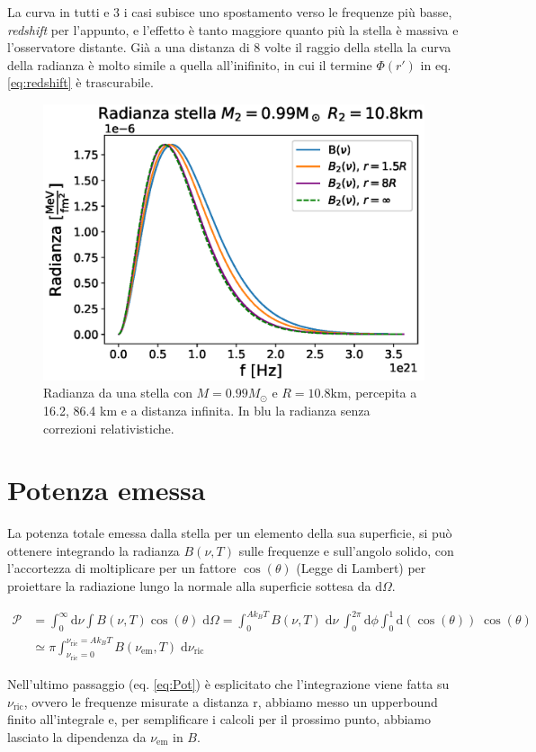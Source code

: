 \documentclass[a4paper, titlepage]{article}
\begin{document}
La curva in tutti e 3 i casi subisce uno spostamento verso le frequenze più
basse, \textit{redshift} per l'appunto, e l'effetto è tanto maggiore quanto più
la stella è massiva e l'osservatore distante. Già a una distanza di 8 volte il
raggio della stella la curva della radianza è molto simile a quella
all'inifinito, in cui il termine $\Phi (r')$ in eq. \ref{eq:redshift} è
trascurabile.
\begin{figure}[h]
    \centering
    \includegraphics[width = 0.6 \textwidth]{Figures/radianza2.eps}
    \caption{Radianza da una stella con $M = 0.99M_\odot$ e
    $R = 10.8\unit{\kilo\meter}$, percepita a 16.2, 86.4 \unit{\kilo\meter} e a
    distanza infinita.
    In blu la radianza senza correzioni relativistiche.}
    \label{fig:rad3}
\end{figure}


\section{Potenza emessa}
La potenza totale emessa dalla stella per un elemento della sua superficie, si
può ottenere integrando la radianza $B(\nu, T)$ sulle frequenze e sull'angolo
solido, con l'accortezza di moltiplicare per un fattore $\cos(\theta)$ (Legge
di Lambert) per proiettare la radiazione lungo la normale alla superficie
sottesa da $\mathrm{d}\Omega$.

\begin{align}
    \mathcal P &= \int_0^\infty \mathrm{d}\nu \int B(\nu, T) \cos(\theta) \;
    \mathrm{d}\Omega
    =  \int_0^{A k_B T} B(\nu, T) \; \mathrm{d}\nu ~ 
    \int_0^{2 \pi} \mathrm{d}\phi \int_0^1 \mathrm{d}(\cos(\theta)) \;
    \cos(\theta) \\
    &\simeq \pi \int_{\nu_\text{ric} = 0}^{\nu_\text{ric}
    = A k_B T} B(\nu_\text{em}, T) \; \mathrm{d}\nu_\text{ric}
    \label{eq:Pot}
\end{align}

Nell'ultimo passaggio (eq. \ref{eq:Pot}) è esplicitato che l'integrazione viene
fatta su $\nu_\text{ric}$, ovvero le frequenze misurate a distanza r, abbiamo
messo un upperbound finito all'integrale e, per semplificare i calcoli per il
prossimo punto, abbiamo lasciato la dipendenza da $\nu_\text{em}$ in $B$.
\end{document}
